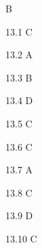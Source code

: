 \begin{Solution}{13}
B
\end{Solution}
\begin{Solution}{13.{1}}
C
\end{Solution}
\begin{Solution}{13.{2}}
A
\end{Solution}
\begin{Solution}{13.{3}}
B
\end{Solution}
\begin{Solution}{13.{4}}
D
\end{Solution}
\begin{Solution}{13.{5}}
C
\end{Solution}
\begin{Solution}{13.{6}}
C
\end{Solution}
\begin{Solution}{13.{7}}
A
\end{Solution}
\begin{Solution}{13.{8}}
C
\end{Solution}
\begin{Solution}{13.{9}}
D
\end{Solution}
\begin{Solution}{13.{10}}
C
\end{Solution}

